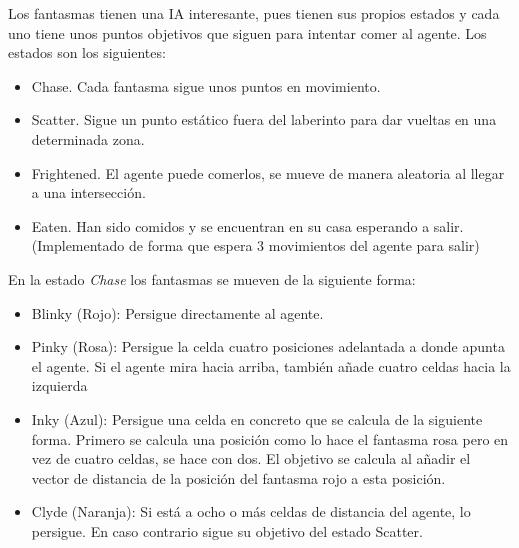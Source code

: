 		\begin{flushleft}
			Los fantasmas tienen una IA interesante, pues tienen sus propios estados y cada uno tiene unos puntos objetivos que siguen para intentar comer al agente. Los estados son los siguientes:
		\end{flushleft}
		\vspace{-0.9cm}
		\begin{itemize}
			\item Chase. Cada fantasma sigue unos puntos en movimiento.
			\vspace*{-0.3cm}
			\item Scatter. Sigue un punto estático fuera del laberinto para dar vueltas en una determinada zona.
			\vspace*{-0.3cm}
			\item Frightened. El agente puede comerlos, se mueve de manera aleatoria al llegar a una intersección.
			\vspace*{-0.3cm}
			\item Eaten. Han sido comidos y se encuentran en su casa esperando a salir. (Implementado de forma que espera 3 movimientos del agente para salir)
		\end{itemize} 
		
		\begin{flushleft}
			En la estado \textit{Chase} los fantasmas se mueven de la siguiente forma:
		\end{flushleft}
		
		\vspace{-0.9cm}
		\begin{itemize}
			\item Blinky (Rojo): Persigue directamente al agente.
			\vspace*{-0.3cm}
			\item Pinky (Rosa): Persigue la celda cuatro posiciones adelantada a donde apunta el agente. Si el agente mira hacia arriba, también añade cuatro celdas hacia la izquierda
			\vspace*{-0.3cm}
			\item Inky (Azul): Persigue una celda en concreto que se calcula de la siguiente forma. Primero se calcula una posición como lo hace el fantasma rosa pero en vez de cuatro celdas, se hace con dos. El objetivo se calcula al añadir el vector de distancia de la posición del fantasma rojo a esta posición.
			\vspace*{-0.3cm}
			\item Clyde (Naranja): Si está a ocho o más celdas de distancia del agente, lo persigue. En caso contrario sigue su objetivo del estado Scatter.
		\end{itemize}
		
